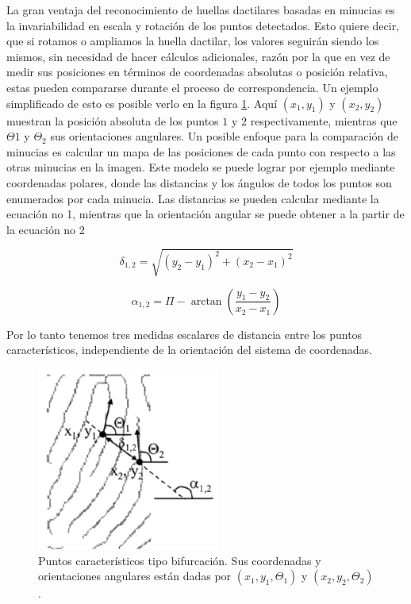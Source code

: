 La gran ventaja del reconocimiento de huellas dactilares basadas en minucias es la invariabilidad en escala y rotación de los puntos detectados. Esto quiere decir, que si rotamos o ampliamos la huella dactilar, los valores seguirán siendo los mismos, sin necesidad de hacer cálculos adicionales, razón por la que en vez de medir sus posiciones en términos de coordenadas absolutas o posición relativa, estas pueden compararse durante el proceso de correspondencia. Un ejemplo simplificado de esto es posible verlo en la figura \ref{minuciasPuntosCarac}. Aquí $\left(x_1 , y_1 \right)$ y $\left( x_2 , y_2 \right)$ muestran la posición absoluta de los puntos $1$ y $2$ respectivamente, mientras que $\Theta 1$ y $\Theta_2$ sus orientaciones angulares. Un posible enfoque para la comparación de minucias es calcular un mapa de las posiciones de cada punto con respecto a las otras minucias en la imagen. Este modelo se puede lograr por ejemplo mediante coordenadas polares, donde las distancias y los ángulos de todos los puntos son enumerados por cada minucia. Las distancias se pueden calcular mediante la ecuación no 1, mientras que la orientación angular se puede obtener a la partir de la ecuación no 2

\begin{equation}
    	\delta_{1,2} = \sqrt{\left( y_2 - y_1 \right)^2 +\left( x_2 - x_1 \right)^2 }
\end{equation}

\begin{equation}
    \alpha_{1,2} = \Pi - \arctan \left( \frac{y_1 - y_2}{x_2 - x_1} \right)
\end{equation}

Por lo tanto tenemos tres medidas escalares de distancia entre los puntos característicos, independiente de la orientación del sistema de coordenadas.

\begin{figure}[H]
\centering
\includegraphics{images/capitulo2/minuciasPuntosCarac.png}
\caption{Puntos característicos tipo bifurcación. Sus coordenadas y orientaciones angulares están dadas por $\left(x_1 , y_1 , \Theta_1 \right)$ y $\left(x_2 , y_2 , \Theta_2 \right)$ .}
\label{minuciasPuntosCarac}
\end{figure}

